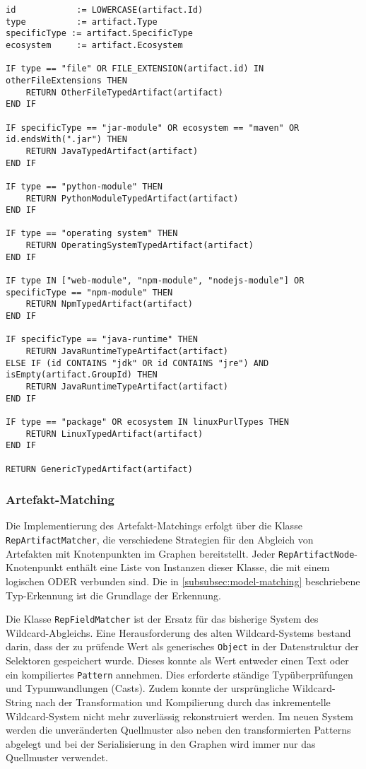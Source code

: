 \begin{lstlisting}[language=pseudo,caption={Typisierung eines Artefakts basierend auf Attributen},label=lst:artifact-typing-code,basicstyle=\ttfamily\scriptsize]
id            := LOWERCASE(artifact.Id)
type          := artifact.Type
specificType := artifact.SpecificType
ecosystem     := artifact.Ecosystem

IF type == "file" OR FILE_EXTENSION(artifact.id) IN otherFileExtensions THEN
    RETURN OtherFileTypedArtifact(artifact)
END IF

IF specificType == "jar-module" OR ecosystem == "maven" OR id.endsWith(".jar") THEN
    RETURN JavaTypedArtifact(artifact)
END IF

IF type == "python-module" THEN
    RETURN PythonModuleTypedArtifact(artifact)
END IF

IF type == "operating system" THEN
    RETURN OperatingSystemTypedArtifact(artifact)
END IF

IF type IN ["web-module", "npm-module", "nodejs-module"] OR specificType == "npm-module" THEN
    RETURN NpmTypedArtifact(artifact)
END IF

IF specificType == "java-runtime" THEN
    RETURN JavaRuntimeTypeArtifact(artifact)
ELSE IF (id CONTAINS "jdk" OR id CONTAINS "jre") AND isEmpty(artifact.GroupId) THEN
    RETURN JavaRuntimeTypeArtifact(artifact)
END IF

IF type == "package" OR ecosystem IN linuxPurlTypes THEN
    RETURN LinuxTypedArtifact(artifact)
END IF

RETURN GenericTypedArtifact(artifact)
\end{lstlisting}

\subsubsection{Artefakt-Matching}

Die Implementierung des Artefakt-Matchings erfolgt über die Klasse \texttt{RepArtifactMatcher}, die verschiedene Strategien für den Abgleich von Artefakten mit Knotenpunkten im Graphen bereitstellt.
Jeder \texttt{RepArtifactNode}-Knotenpunkt enthält eine Liste von Instanzen dieser Klasse, die mit einem logischen ODER verbunden sind.
Die in \autoref{subsubsec:model-matching} beschriebene Typ-Erkennung ist die Grundlage der Erkennung.

Die Klasse \texttt{RepFieldMatcher} ist der Ersatz für das bisherige System des Wildcard-Abgleichs.
Eine Herausforderung des alten Wildcard-Systems bestand darin, dass der zu prüfende Wert als generisches \texttt{Object} in der Datenstruktur der Selektoren gespeichert wurde.
Dieses konnte als Wert entweder einen Text oder ein kompiliertes \texttt{Pattern} annehmen.
Dies erforderte ständige Typüberprüfungen und Typumwandlungen (Casts).
Zudem konnte der ursprüngliche Wildcard-String nach der Transformation und Kompilierung durch das inkrementelle Wildcard-System nicht mehr zuverlässig rekonstruiert werden.
Im neuen System werden die unveränderten Quellmuster also neben den transformierten Patterns abgelegt und bei der Serialisierung in den Graphen wird immer nur das Quellmuster verwendet.

